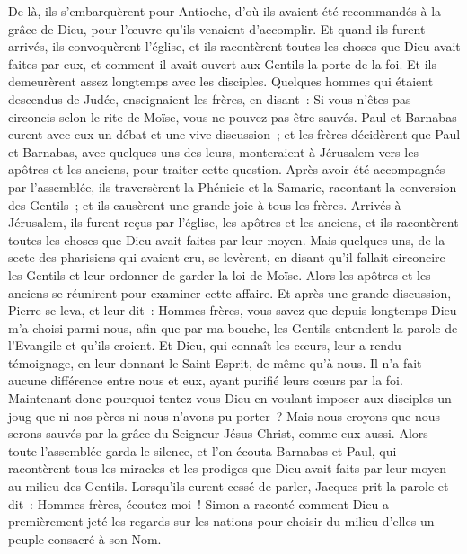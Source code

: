 \begin{multicols}{2}
De là, ils s'embarquèrent pour Antioche, d'où ils avaient été recommandés à la grâce de Dieu, pour l'œuvre qu'ils venaient d'accomplir.
Et quand ils furent arrivés, ils convoquèrent l'église, et ils racontèrent toutes les choses que Dieu avait faites par eux, et comment il avait ouvert aux Gentils la porte de la foi.
Et ils demeurèrent assez longtemps avec les disciples.
\VerseOne{}Quelques hommes qui étaient descendus de Judée, enseignaient les frères, en disant~: Si vous n'êtes pas circoncis selon le rite de Moïse, vous ne pouvez pas être sauvés.
Paul et Barnabas eurent avec eux un débat et une vive discussion~; et les frères décidèrent que Paul et Barnabas, avec quelques-uns des leurs, monteraient à Jérusalem vers les apôtres et les anciens, pour traiter cette question.
Après avoir été accompagnés par l'assemblée, ils traversèrent la Phénicie et la Samarie, racontant la conversion des Gentils~; et ils causèrent une grande joie à tous les frères.
Arrivés à Jérusalem, ils furent reçus par l'église, les apôtres et les anciens, et ils racontèrent toutes les choses que Dieu avait faites par leur moyen.
Mais quelques-uns, de la secte des pharisiens qui avaient cru, se levèrent, en disant qu'il fallait circoncire les Gentils et leur ordonner de garder la loi de Moïse.
Alors les apôtres et les anciens se réunirent pour examiner cette affaire.
Et après une grande discussion, Pierre se leva, et leur dit~: Hommes frères, vous savez que depuis longtemps Dieu m'a choisi parmi nous, afin que par ma bouche, les Gentils entendent la parole de l'Evangile et qu'ils croient.
Et Dieu, qui connaît les cœurs, leur a rendu témoignage, en leur donnant le Saint-Esprit, de même qu'à nous.
Il n'a fait aucune différence entre nous et eux, ayant purifié leurs cœurs par la foi.
Maintenant donc pourquoi tentez-vous Dieu en voulant imposer aux disciples un joug que ni nos pères ni nous n'avons pu porter~?
Mais nous croyons que nous serons sauvés par la grâce du Seigneur Jésus-Christ, comme eux aussi.
Alors toute l'assemblée garda le silence, et l'on écouta Barnabas et Paul, qui racontèrent tous les miracles et les prodiges que Dieu avait faits par leur moyen au milieu des Gentils.
Lorsqu'ils eurent cessé de parler, Jacques prit la parole et dit~: Hommes frères, écoutez-moi~!
Simon a raconté comment Dieu a premièrement jeté les regards sur les nations pour choisir du milieu d'elles un peuple consacré à son Nom. 

\end{multicols}
